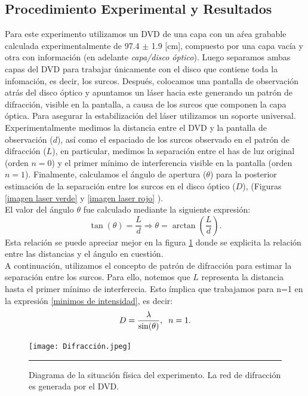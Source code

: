 \documentclass[10pt,a4paper]{article}
\begin{document}
\begin{multicols}{2}
		\section{Procedimiento Experimental y Resultados}
		Para este experimento utilizamos un DVD de una capa con un aŕea grabable calculada experimentalmente de 97.4 $\pm$ 1.9 [cm], compuesto por una capa vacía y otra con información (en adelante \emph{capa/disco óptico}). Luego separamos ambas capas del DVD para trabajar únicamente con el disco que contiene toda la infomación, es decir, los surcos. Después, colocamos una pantalla de observación atrás del disco óptico y apuntamos un láser hacia este generando un patrón de difracción, visible en la pantalla, a causa de los surcos que componen la capa óptica. Para asegurar la estabilización del láser utilizamos un soporte universal.\\
		
		Experimentalmente medimos la distancia entre el DVD y la pantalla de observación ($d$), así como el espaciado de los surcos observado en el patrón de difracción ($L$), en particular, medimos la separación entre el has de luz original (orden $n=0$) y el primer mínimo de interferencia visible en la pantalla (orden $n=1$). Finalmente, calculamos el ángulo de apertura ($\theta$) para la posterior estimación de la separación entre los surcos en el disco óptico ($D$), (Figuras \ref{imagen laser verde} y \ref{imagen laser rojo} ). \\
		El valor del ángulo $\theta$ fue calculado mediante la siguiente expresión:
		\begin{equation}
		\tan(\theta) = \frac{L}{d} \Longrightarrow \theta = \arctan(\frac{L}{d}).
		\end{equation}
		Esta relación se puede apreciar mejor en la figura \ref{Diagarama} donde se explicita la relación entre las distancias y el ángulo en cuestión.\\
		A continuación, utilizamos el concepto de patrón de difracción para estimar la separación entre los surcos. Para ello, notemos que $L$ representa la distancia hasta el primer mínimo de interferecia. Esto ímplica que trabajamos para n=1 en la expresión \ref{minimos de intensidad}, es decir:
		\begin{equation}
		D = \frac{\lambda}{\sin(\theta)}, \hspace{2mm} n = 1.
		\end{equation}
		\begin{figure}[H]
			\centering
			\texttt{[image: Difracción.jpeg]}
			\caption{Diagrama de la situación física del experimento. La red de difracción es generada por el DVD.}
			\label{Diagarama}
			\rule{80mm}{0.1mm}
		\end{figure}
	

\end{multicols}
\end{document}
